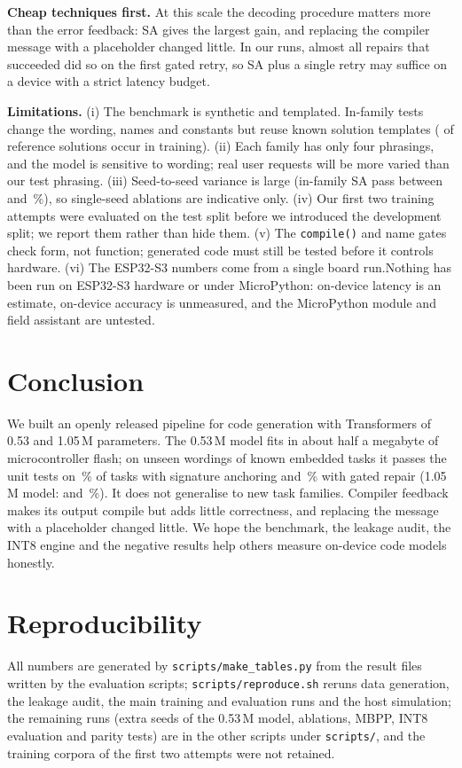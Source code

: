\textbf{Cheap techniques first.} At this scale the decoding procedure matters more than the error feedback: SA gives the largest gain, and replacing the compiler message with a placeholder changed little. In our runs, almost all repairs that succeeded did so on the first gated retry, so SA plus a single retry may suffice on a device with a strict latency budget.

\textbf{Limitations.} (i) The benchmark is synthetic and templated. In-family tests change the wording, names and constants but reuse known solution templates (\codeoverlapid{} of \ntestid{} reference solutions occur in training). (ii) Each family has only four phrasings, and the model is sensitive to wording; real user requests will be more varied than our test phrasing. (iii) Seed-to-seed variance is large (in-family SA pass between \testidanchorpassmin{} and \testidanchorpassmax\,\%), so single-seed ablations are indicative only. (iv) Our first two training attempts were evaluated on the test split before we introduced the development split; we report them rather than hide them. (v) The \texttt{compile()} and name gates check form, not function; generated code must still be tested before it controls hardware. (vi) \ifdefined\devdecode The ESP32-S3 numbers come from a single board run.\else Nothing has been run on ESP32-S3 hardware or under MicroPython: on-device latency is an estimate, on-device accuracy is unmeasured, and the MicroPython module and field assistant are untested.\fi

\section{Conclusion}
We built an openly released pipeline for code generation with Transformers of 0.53 and 1.05\,M parameters. The 0.53\,M model fits in about half a megabyte of microcontroller flash; on unseen wordings of known embedded tasks it passes the unit tests on \seedsSmalltestidanchor\,\% of tasks with signature anchoring and \seedsSmalltestidareflint\,\% with gated repair (1.05\,M model: \testidanchorpass{} and \testidareflintpass\,\%). It does not generalise to new task families. Compiler feedback makes its output compile but adds little correctness, and replacing the message with a placeholder changed little. We hope the benchmark, the leakage audit, the INT8 engine and the negative results help others measure on-device code models honestly.

\section*{Reproducibility}
All numbers are generated by \texttt{scripts/make\_tables.py} from the result files written by the evaluation scripts; \texttt{scripts/reproduce.sh} reruns data generation, the leakage audit, the main training and evaluation runs and the host simulation; the remaining runs (extra seeds of the 0.53\,M model, ablations, MBPP, INT8 evaluation and parity tests) are in the other scripts under \texttt{scripts/}, and the training corpora of the first two attempts were not retained.


